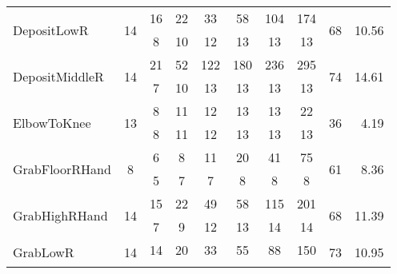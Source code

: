 \begin{table}[t]
\begin{center}
\begin{tabular}{|l|c|*{6}{c}|c|r|}
\hline \multirow{2}{*}{                   DepositLowR} &
\multirow{2}{*}{  14} & {\tiny   16} & {\tiny   22} & {\tiny
33} & {\tiny   58} & {\tiny  104} & {\tiny  174} &
\multirow{2}{*}{    68} & \multirow{2}{*}{ 10.56} \\ & &
{\tiny    8} & {\tiny   10} & {\tiny   12} & {\tiny   13} & {\tiny   13} & {\tiny   13} & & \\
\hline \multirow{2}{*}{                DepositMiddleR} &
\multirow{2}{*}{  14} & {\tiny   21} & {\tiny   52} & {\tiny
122} & {\tiny  180} & {\tiny  236} & {\tiny  295} &
\multirow{2}{*}{    74} & \multirow{2}{*}{ 14.61} \\ & &
{\tiny    7} & {\tiny   10} & {\tiny   13} & {\tiny   13} & {\tiny   13} & {\tiny   13} & & \\
\hline
\multirow{2}{*}{   ElbowToKnee} & \multirow{2}{*}{  13} & {\tiny
8} & {\tiny   11} & {\tiny   12} & {\tiny   13} & {\tiny   13} &
{\tiny   22} & \multirow{2}{*}{    36} & \multirow{2}{*}{  4.19}
\\ & &
{\tiny    8} & {\tiny   11} & {\tiny   12} & {\tiny   13} & {\tiny   13} & {\tiny   13} & & \\
\hline \multirow{2}{*}{              GrabFloorRHand} &
\multirow{2}{*}{   8} & {\tiny    6} & {\tiny    8} & {\tiny 11}
& {\tiny   20} & {\tiny   41} & {\tiny   75} & \multirow{2}{*}{
61} & \multirow{2}{*}{  8.36} \\ & &
{\tiny    5} & {\tiny    7} & {\tiny    7} & {\tiny    8} & {\tiny    8} & {\tiny    8} & & \\
\hline \multirow{2}{*}{              GrabHighRHand} &
\multirow{2}{*}{  14} & {\tiny   15} & {\tiny   22} & {\tiny 49}
& {\tiny   58} & {\tiny  115} & {\tiny  201} & \multirow{2}{*}{
68} & \multirow{2}{*}{ 11.39} \\ & &
{\tiny    7} & {\tiny    9} & {\tiny   12} & {\tiny   13} & {\tiny   14} & {\tiny   14} & & \\
\hline \multirow{2}{*}{                      GrabLowR} &
\multirow{2}{*}{  14} & {\tiny   14} & {\tiny   20} & {\tiny
33} & {\tiny   55} & {\tiny   88} & {\tiny  150} &
\multirow{2}{*}{    73} & \multirow{2}{*}{ 10.95} \\ & &

\end{tabular}
\end{center}
\end{table}

